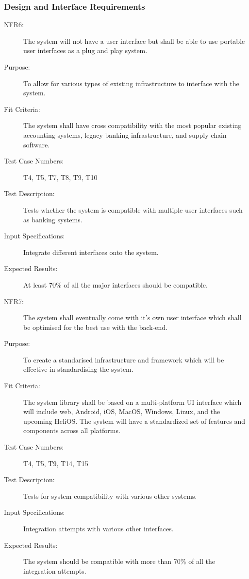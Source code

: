 \documentclass[a4paper,twoside,phd]{BYUPhys}
\begin{document}
\subsubsection{Design and Interface Requirements}
\begin{description}
\item[NFR6:] The system will not have a user interface but shall be able to use portable user interfaces as a plug and play system.
\item[Purpose:] To allow for various types of existing infrastructure to interface with the system.
\item[Fit Criteria:] The system shall have cross compatibility with the most popular existing accounting systems, legacy banking infrastructure, and supply chain software.
\item[Test Case Numbers:] T4, T5, T7, T8, T9, T10
\item[Test Description:] Tests whether the system is compatible with multiple user interfaces such as banking systems.
\item[Input Specifications:] Integrate different interfaces onto the system.
\item[Expected Results:] At least 70\% of all the major interfaces should be compatible.
\item[NFR7:] The system shall eventually come with it’s own user interface which shall be optimised for the best use with the back-end.
\item[Purpose:] To create a standarised infrastructure and framework which will be effective in standardising the system.
\item[Fit Criteria:] The system library shall be based on a multi-platform UI interface which will include web, Android, iOS, MacOS, Windows, Linux, and the upcoming HeliOS. The system will have a standardized set of features and components across all platforms. 
\item[Test Case Numbers:] T4, T5, T9, T14, T15 
\item[Test Description:] Tests for system compatibility with various other systems.
\item[Input Specifications:] Integration attempts with various other interfaces.
\item[Expected Results:] The system should be compatible with more than 70\% of all the integration attempts.


\end{description}
\end{document}
